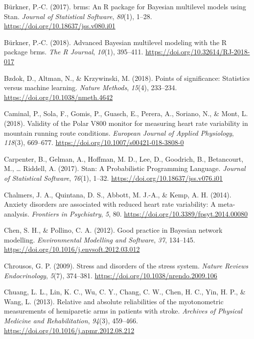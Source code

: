 \documentclass[
  english,
  man,floatsintext]{apa6}
\begin{document}
\leavevmode\hypertarget{ref-R-brms_a}{}%
Bürkner, P.-C. (2017). brms: An R package for Bayesian multilevel models using Stan. \emph{Journal of Statistical Software}, \emph{80}(1), 1--28. \url{https://doi.org/10.18637/jss.v080.i01}

\leavevmode\hypertarget{ref-R-brms_b}{}%
Bürkner, P.-C. (2018). Advanced Bayesian multilevel modeling with the R package brms. \emph{The R Journal}, \emph{10}(1), 395--411. \url{https://doi.org/10.32614/RJ-2018-017}

\leavevmode\hypertarget{ref-Bzdok2018}{}%
Bzdok, D., Altman, N., \& Krzywinski, M. (2018). Points of significance: Statistics versus machine learning. \emph{Nature Methods}, \emph{15}(4), 233--234. \url{https://doi.org/10.1038/nmeth.4642}

\leavevmode\hypertarget{ref-Caminal2018}{}%
Caminal, P., Sola, F., Gomis, P., Guasch, E., Perera, A., Soriano, N., \& Mont, L. (2018). Validity of the Polar V800 monitor for measuring heart rate variability in mountain running route conditions. \emph{European Journal of Applied Physiology}, \emph{118}(3), 669--677. \url{https://doi.org/10.1007/s00421-018-3808-0}

\leavevmode\hypertarget{ref-Carpenter2017}{}%
Carpenter, B., Gelman, A., Hoffman, M. D., Lee, D., Goodrich, B., Betancourt, M., \ldots{} Riddell, A. (2017). Stan: A Probabilistic Programming Language. \emph{Journal of Statistical Software}, \emph{76}(1), 1--32. \url{https://doi.org/10.18637/jss.v076.i01}

\leavevmode\hypertarget{ref-Chalmers2014}{}%
Chalmers, J. A., Quintana, D. S., Abbott, M. J.-A., \& Kemp, A. H. (2014). Anxiety disorders are associated with reduced heart rate variability: A meta-analysis. \emph{Frontiers in Psychiatry}, \emph{5}, 80. \url{https://doi.org/10.3389/fpsyt.2014.00080}

\leavevmode\hypertarget{ref-Chen2012}{}%
Chen, S. H., \& Pollino, C. A. (2012). Good practice in Bayesian network modelling. \emph{Environmental Modelling and Software}, \emph{37}, 134--145. \url{https://doi.org/10.1016/j.envsoft.2012.03.012}

\leavevmode\hypertarget{ref-Chrousos2009}{}%
Chrousos, G. P. (2009). Stress and disorders of the stress system. \emph{Nature Reviews Endocrinology}, \emph{5}(7), 374--381. \url{https://doi.org/10.1038/nrendo.2009.106}

\leavevmode\hypertarget{ref-Chuang2013}{}%
Chuang, L. L., Lin, K. C., Wu, C. Y., Chang, C. W., Chen, H. C., Yin, H. P., \& Wang, L. (2013). Relative and absolute reliabilities of the myotonometric measurements of hemiparetic arms in patients with stroke. \emph{Archives of Physical Medicine and Rehabilitation}, \emph{94}(3), 459--466. \url{https://doi.org/10.1016/j.apmr.2012.08.212}
\end{document}
